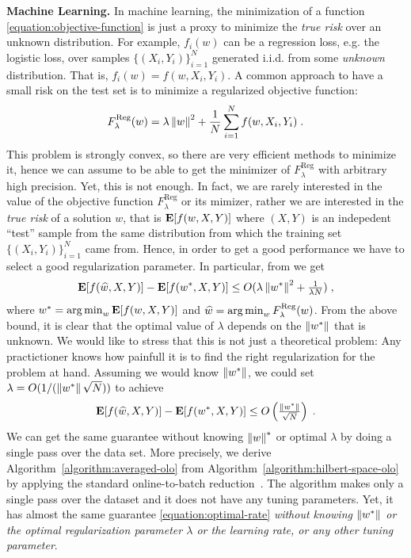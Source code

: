 \textbf{Machine Learning.} In machine learning, the minimization of a function
\eqref{equation:objective-function} is just a proxy to minimize the \emph{true
risk} over an unknown distribution. For example, $f_i(w)$ can be a
regression loss, e.g. the logistic loss, over samples $\{(X_i,
Y_i)\}_{i=1}^N$ generated i.i.d. from some \emph{unknown} distribution.
That is, $f_i(w)=f(w,X_i,Y_i)$. A common approach to
have a small risk on the test set is to minimize a regularized objective
function:
%
\begin{equation}
\label{equation:reg_logloss}
F_\lambda^{\text{Reg}}(w) = \lambda \left\|{w}\right\|^2 + \frac{1}{N} \sum_{i=1}^N f(w, X_i, Y_i) \; .
\end{equation}
%
This problem is strongly convex, so there are very efficient methods to
minimize it, hence we can assume to be able to get the minimizer of
$F_\lambda^{\text{Reg}}$ with arbitrary high precision. Yet, this is not
enough. In fact, we are rarely interested in the value of the objective
function $F_\lambda^{\text{Reg}}$ or its mimizer, rather we are interested in
the \emph{true risk} of a solution $w$, that is $\operatorname*{\mathbf{E}}[f(w,X,Y)]$ where $(X,Y)$
is an indepedent ``test'' sample from the same distribution from which the
training set $\{(X_i,Y_i)\}_{i=1}^N$ came from. Hence, in order to get a good
performance we have to select a good regularization parameter. In particular,
from \cite{Sridharan-Shalev-Shwartz-Srebro-2009} we get
\[
\operatorname*{\mathbf{E}}[f(\widehat{w},X,Y)] - \operatorname*{\mathbf{E}}[f(w^*,X,Y)] \le O(\lambda \left\|{w^*}\right\|^2 + \tfrac{1}{\lambda N}) \; ,
\]
where $w^*=\operatorname*{arg\,min}_w \operatorname*{\mathbf{E}}[f(w,X,Y)]$ and $\widehat{w} = \operatorname*{arg\,min}_w
F_\lambda^{\text{Reg}}(w)$.  From the above bound, it is clear that the optimal value
of $\lambda$ depends on the $\left\|{w^*}\right\|$ that is unknown. We would like to
stress that this is not just a theoretical problem: Any practictioner knows how
painfull it is to find the right regularization for the problem at hand.
Assuming we would know $\left\|{w^*}\right\|$, we could set $\lambda = O(1/(\left\|{w^*}\right\|
\sqrt{N}))$ to achieve
%
\begin{equation}
\label{equation:optimal-rate}
\operatorname*{\mathbf{E}}[f(\widehat{w},X,Y)] - \operatorname*{\mathbf{E}}[f(w^*,X,Y)] \le O\left(\tfrac{\left\|{w^*}\right\|}{\sqrt{N}}\right) \; .
\end{equation}
We can get the same guarantee without knowing $\left\|{w}\right\|^*$ or optimal $\lambda$
by doing a single pass over the data set. More precisely, we derive
Algorithm~\ref{algorithm:averaged-olo} from
Algorithm~\ref{algorithm:hilbert-space-olo} by applying the standard
online-to-batch reduction~\citep{Shalev-Shwartz-2011}.  The algorithm makes
only a single pass over the dataset and it does not have any tuning parameters.
Yet, it has almost the same guarantee \eqref{equation:optimal-rate}
\emph{without knowing $\left\|{w^*}\right\|$ or the optimal regularization parameter
$\lambda$ or the learning rate, or any other tuning parameter}.

